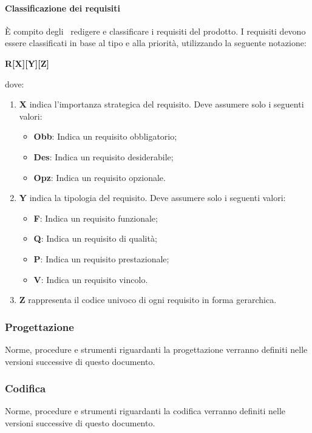 \documentclass[../NormeProgetto.tex]{subfiles}
\begin{document}
				\paragraph{Classificazione dei requisiti}
					È compito degli \analisti\ redigere e classificare i requisiti del prodotto\g.  I requisiti devono essere classificati in base al tipo e alla priorità, utilizzando la seguente notazione:
					\begin{center}\textbf{R[X][Y][Z]}\end{center} dove:
						\begin{enumerate}
							\item \textbf{X} indica l'importanza strategica del requisito. Deve assumere solo i seguenti valori:
							\begin{itemize}
								\item \textbf{Obb}: Indica un requisito obbligatorio;
								\item \textbf{Des}: Indica un requisito desiderabile;
								\item \textbf{Opz}: Indica un requisito opzionale.
							\end{itemize}
							\item \textbf{Y} indica la tipologia del requisito. Deve assumere solo i seguenti valori:
							\begin{itemize}
								\item \textbf{F}: Indica un requisito funzionale;
								\item \textbf{Q}: Indica un requisito di qualità;
								\item \textbf{P}: Indica un requisito prestazionale;
								\item \textbf{V}: Indica un requisito vincolo.
							\end{itemize}
							\item \textbf{Z} rappresenta il codice univoco di ogni requisito in forma gerarchica.
						\end{enumerate}
		\subsubsection{Progettazione}
			Norme, procedure e strumenti riguardanti la progettazione verranno definiti nelle versioni successive di questo documento.
		\subsubsection{Codifica}
			Norme, procedure e strumenti riguardanti la codifica verranno definiti nelle versioni successive di questo documento.
		
\end{document}
